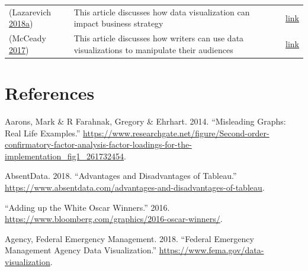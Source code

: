 \documentclass[]{book}
\begin{document}
\begin{longtable}[]{@{}lll@{}}
\begin{minipage}[t]{0.15\columnwidth}
(Lazarevich \protect\hyperlink{ref-strategy_impact}{2018}\protect\hyperlink{ref-strategy_impact}{a})\strut
\end{minipage} & \begin{minipage}[t]{0.28\columnwidth}\raggedright
This article discusses how data visualization can impact business strategy\strut
\end{minipage} & \begin{minipage}[t]{0.48\columnwidth}\raggedright
\href{https://www.iotforall.com/data-visualization-strategy-for-business/}{link}\strut
\end{minipage}\tabularnewline
\begin{minipage}[t]{0.15\columnwidth}\raggedright
(McCeady \protect\hyperlink{ref-writers_manipulate}{2017})\strut
\end{minipage} & \begin{minipage}[t]{0.28\columnwidth}\raggedright
This article discusses how writers can use data visualizations to manipulate their audiences\strut
\end{minipage} & \begin{minipage}[t]{0.48\columnwidth}\raggedright
\href{https://venngage.com/blog/misleading-graphs/}{link}\strut
\end{minipage}\tabularnewline
\bottomrule
\end{longtable}

\hypertarget{references-1}{%
\chapter*{References}\label{references-1}}

\hypertarget{refs}{}
\leavevmode\hypertarget{ref-aarons_2014}{}%
Aarons, Mark \& R Farahnak, Gregory \& Ehrhart. 2014. ``Misleading Graphs: Real Life Examples.'' \url{https://www.researchgate.net/figure/Second-order-confirmatory-factor-analysis-factor-loadings-for-the-implementation_fig1_261732454}.

\leavevmode\hypertarget{ref-tableau_interactive_viz}{}%
AbsentData. 2018. ``Advantages and Disadvantages of Tableau.'' \url{https://www.absentdata.com/advantages-and-disadvantages-of-tableau}.

\leavevmode\hypertarget{ref-adding_oscars}{}%
``Adding up the White Oscar Winners.'' 2016. \url{https://www.bloomberg.com/graphics/2016-oscar-winners/}.

\leavevmode\hypertarget{ref-fema_viz}{}%
Agency, Federal Emergency Management. 2018. ``Federal Emergency Management Agency Data Visualization.'' \url{https://www.fema.gov/data-visualization}.
\end{document}
